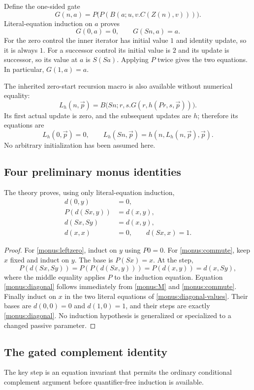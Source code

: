 Define the one-sided gate
\[
 G(n,a)=P\bigl(P(B(a;u,v.C(Z(n),v)))\bigr).
\]
Literal-equation induction on $a$ proves
\[
 G(0,a)=0,\qquad G(Sn,a)=a.
 \tag{G}\label{monus:G}
\]
For the zero control the inner iterator has initial value $1$ and identity
update, so it is always $1$. For a successor control its initial value is
$2$ and its update is successor, so its value at $a$ is $S(Sa)$. Applying
$P$ twice gives the two equations. In particular, $G(1,a)=a$.

The inherited zero-start recursion macro is also available without
numerical equality:
\[
 L_h(n,\vec p)=B\bigl(Sn;r,s.G(r,h(Pr,s,\vec p))\bigr).
\]
Its first actual update is zero, and the subsequent updates are $h$;
therefore its equations are
\[
 L_h(0,\vec p)=0,\qquad
 L_h(Sn,\vec p)=h(n,L_h(n,\vec p),\vec p).
 \tag{L}
\]
No arbitrary initialization has been assumed here.

\subsection{Four preliminary monus identities}

\begin{lemma}\label{monus:preliminary}
The theory proves, using only literal-equation induction,
\begin{align}
 d(0,y)&=0,\label{monus:leftzero}\\
 P(d(Sx,y))&=d(x,y),\label{monus:commute}\\
 d(Sx,Sy)&=d(x,y),\label{monus:diagonal}\\
 d(x,x)&=0,\qquad d(Sx,x)=1.\label{monus:diagonal-values}
\end{align}
\end{lemma}
\begin{proof}
For \eqref{monus:leftzero}, induct on $y$ using $P0=0$.
For \eqref{monus:commute}, keep $x$ fixed and induct on $y$.
The base is $P(Sx)=x$. At the step,
\[
 P(d(Sx,Sy))=P(P(d(Sx,y)))
           =P(d(x,y))=d(x,Sy),
\]
where the middle equality applies $P$ to the induction equation.
Equation \eqref{monus:diagonal} follows immediately from
\eqref{monus:M} and \eqref{monus:commute}.
Finally induct on $x$ in the two literal equations of
\eqref{monus:diagonal-values}. Their bases are $d(0,0)=0$ and
$d(1,0)=1$, and their steps are exactly \eqref{monus:diagonal}.
No induction hypothesis is generalized or specialized to a changed
passive parameter.
\end{proof}

\subsection{The gated complement identity}
The key step is an equation invariant that permits the ordinary
conditional complement argument before quantifier-free induction is
available.

